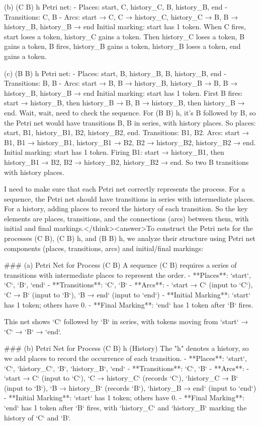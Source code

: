 (b) (C B) h Petri net:
- Places: start, C, history_C, B, history_B, end
- Transitions: C, B
- Arcs: start → C, C → history_C, history_C → B, B → history_B, history_B → end
Initial marking: start has 1 token. When C fires, start loses a token, history_C gains a token. Then history_C loses a token, B gains a token, B fires, history_B gains a token, history_B loses a token, end gains a token.

(c) (B B) h Petri net:
- Places: start, B, history_B, B, history_B, end
- Transitions: B, B
- Arcs: start → B, B → history_B, history_B → B, B → history_B, history_B → end
Initial marking: start has 1 token. First B fires: start → history_B, then history_B → B, B → history_B, then history_B → end. Wait, wait, need to check the sequence. For (B B) h, it's B followed by B, so the Petri net would have transitions B, B in series, with history places. So places: start, B1, history_B1, B2, history_B2, end. Transitions: B1, B2. Arcs: start → B1, B1 → history_B1, history_B1 → B2, B2 → history_B2, history_B2 → end. Initial marking: start has 1 token. Firing B1: start → history_B1, then history_B1 → B2, B2 → history_B2, history_B2 → end. So two B transitions with history places.

I need to make sure that each Petri net correctly represents the process. For a sequence, the Petri net should have transitions in series with intermediate places. For a history, adding places to record the history of each transition. So the key elements are places, transitions, and the connections (arcs) between them, with initial and final markings.</think><answer>To construct the Petri nets for the processes (C B), (C B) h, and (B B) h, we analyze their structure using Petri net components (places, transitions, arcs) and initial/final markings:  


### (a) Petri Net for Process (C B)  
A sequence (C B) requires a series of transitions with intermediate places to represent the order.  
- **Places**: `start`, `C`, `B`, `end`  
- **Transitions**: `C`, `B`  
- **Arcs**:  
  - `start → C` (input to `C`), `C → B` (input to `B`), `B → end` (input to `end`)  
- **Initial Marking**: `start` has 1 token; others have 0.  
- **Final Marking**: `end` has 1 token after `B` fires.  

This net shows `C` followed by `B` in series, with tokens moving from `start` → `C` → `B` → `end`.  


### (b) Petri Net for Process (C B) h (History)  
The "h" denotes a history, so we add places to record the occurrence of each transition.  
- **Places**: `start`, `C`, `history_C`, `B`, `history_B`, `end`  
- **Transitions**: `C`, `B`  
- **Arcs**:  
  - `start → C` (input to `C`), `C → history_C` (records `C`), `history_C → B` (input to `B`), `B → history_B` (records `B`), `history_B → end` (input to `end`)  
- **Initial Marking**: `start` has 1 token; others have 0.  
- **Final Marking**: `end` has 1 token after `B` fires, with `history_C` and `history_B` marking the history of `C` and `B`.  

